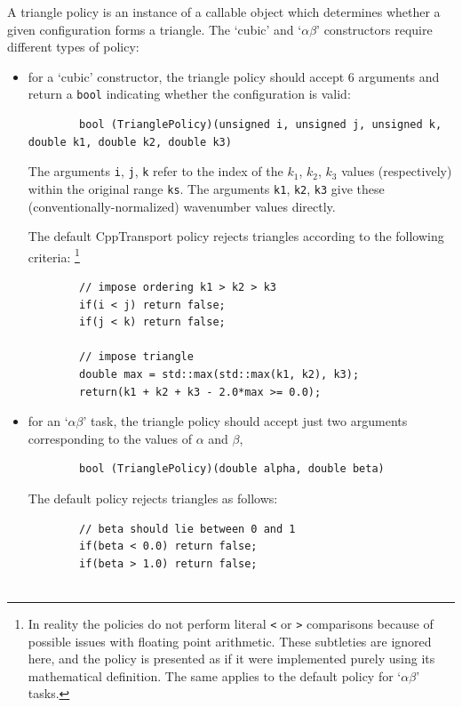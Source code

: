 \documentclass[11pt,a4paper]{article}
\newcommand{\packagefont}{\sffamily}
\newcommand{\CppTransport}{{\packagefont CppTransport}}
\begin{document}
A triangle policy is an instance of a callable object which
determines whether a given configuration forms a triangle.
The `cubic' and `$\alpha\beta$' constructors require different types of policy:
\begin{itemize}
    \item for a `cubic' constructor, the triangle policy should accept 6 arguments
    and return a \texttt{bool} indicating whether the configuration is valid:
    \begin{verbatim}
        bool (TrianglePolicy)(unsigned i, unsigned j, unsigned k, double k1, double k2, double k3)
    \end{verbatim}
    The arguments \texttt{i}, \texttt{j}, \texttt{k}
    refer to the index of the $k_1$, $k_2$, $k_3$ values (respectively)
    within the original range \texttt{ks}.
    The arguments \texttt{k1}, \texttt{k2}, \texttt{k3}
    give these (conventionally-normalized) wavenumber values directly.
    
    The default {\CppTransport} policy rejects triangles according to the following
    criteria:%
        \footnote{In reality the policies do not perform literal \texttt{<}
        or \texttt{>} comparisons because of possible issues with
        floating point arithmetic. These subtleties are ignored here, and the
        policy is presented as if it were implemented purely using its
        mathematical definition. The same applies to the default
        policy for `$\alpha\beta$' tasks.}
    \begin{verbatim}
        // impose ordering k1 > k2 > k3
        if(i < j) return false;
        if(j < k) return false;

        // impose triangle
        double max = std::max(std::max(k1, k2), k3);
        return(k1 + k2 + k3 - 2.0*max >= 0.0);
    \end{verbatim}

    \item for an `$\alpha\beta$' task, the triangle policy should accept just two
    arguments corresponding to the values of $\alpha$ and $\beta$,
    \begin{verbatim}
        bool (TrianglePolicy)(double alpha, double beta)    
    \end{verbatim}
    The default policy rejects triangles as follows:
    \begin{verbatim}
        // beta should lie between 0 and 1
        if(beta < 0.0) return false;
        if(beta > 1.0) return false;


\end{verbatim}
\end{itemize}
\end{document}

